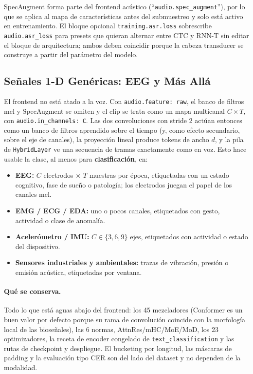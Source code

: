 SpecAugment forma parte del frontend acústico (``\texttt{audio.spec\_augment}''), por lo que se aplica al mapa de características antes del submuestreo y solo está activo en entrenamiento. El bloque opcional \texttt{training.asr.loss} sobrescribe \texttt{audio.asr\_loss} para presets que quieran alternar entre CTC y RNN-T sin editar el bloque de arquitectura; ambos deben coincidir porque la cabeza transducer se construye a partir del parámetro del modelo.

\subsection{Señales 1-D Genéricas: EEG y Más Allá}
\label{sec:annex-audio-eeg}

El frontend no está atado a la voz. Con \texttt{audio.feature: raw}, el banco de filtros mel y SpecAugment se omiten y el clip se trata como un mapa multicanal $C \times T$, con \texttt{audio.in\_channels: C}. Las dos convoluciones con stride 2 actúan entonces como un banco de filtros aprendido sobre el tiempo (y, como efecto secundario, sobre el eje de canales), la proyección lineal produce tokens de ancho $d$, y la pila de \texttt{HybridLayer} ve una secuencia de tramas exactamente como en voz. Esto hace usable la clase, al menos para \textbf{clasificación}, en:

\begin{itemize}[leftmargin=*]
    \item \textbf{EEG:} $C$ electrodos $\times$ $T$ muestras por época, etiquetadas con un estado cognitivo, fase de sueño o patología; los electrodos juegan el papel de los canales mel.
    \item \textbf{EMG / ECG / EDA:} uno o pocos canales, etiquetados con gesto, actividad o clase de anomalía.
    \item \textbf{Acelerómetro / IMU:} $C \in \{3, 6, 9\}$ ejes, etiquetados con actividad o estado del dispositivo.
    \item \textbf{Sensores industriales y ambientales:} trazas de vibración, presión o emisión acústica, etiquetadas por ventana.
\end{itemize}

\paragraph{Qué se conserva.} Todo lo que está aguas abajo del frontend: los 45 mezcladores (Conformer es un buen valor por defecto porque su rama de convolución coincide con la morfología local de las bioseñales), las 6 normas, AttnRes/mHC/MoE/MoD, los 23 optimizadores, la receta de encoder congelado de \texttt{text\_classification} y las rutas de checkpoint y despliegue. El bucketing por longitud, las máscaras de padding y la evaluación tipo CER son del lado del dataset y no dependen de la modalidad.

